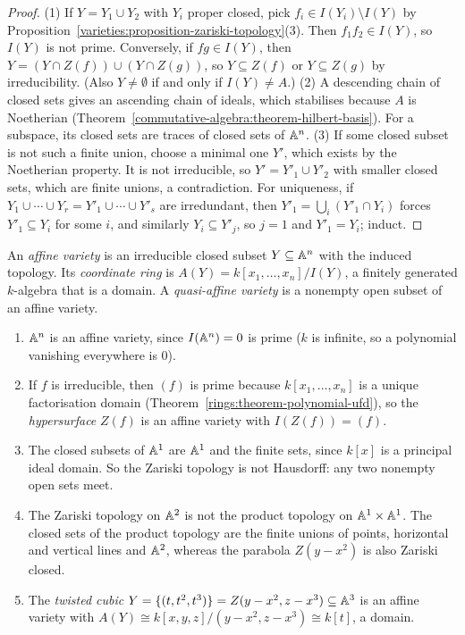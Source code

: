 \begin{proof}
(1) If $Y = Y_1 \cup Y_2$ with $Y_i$ proper closed, pick $f_i \in I(Y_i) \setminus I(Y)$ by Proposition~\ref{varieties:proposition-zariski-topology}(3).
Then $f_1f_2 \in I(Y)$, so $I(Y)$ is not prime. Conversely, if $fg \in I(Y)$, then $Y = (Y \cap Z(f)) \cup (Y \cap Z(g))$, so $Y \subseteq Z(f)$ or
$Y \subseteq Z(g)$ by irreducibility. (Also $Y \neq \emptyset$ if and only if $I(Y) \neq A$.) (2) A descending chain of closed sets gives an
ascending chain of ideals, which stabilises because $A$ is Noetherian (Theorem~\ref{commutative-algebra:theorem-hilbert-basis}). For a subspace,
its closed sets are traces of closed sets of $\mathbb{A}^n$. (3) If some closed subset is not such a finite union, choose a minimal one $Y'$, which
exists by the Noetherian property. It is not irreducible, so $Y' = Y'_1 \cup Y'_2$ with smaller closed sets, which are finite unions, a
contradiction. For uniqueness, if $Y_1 \cup \cdots \cup Y_r = Y'_1 \cup \cdots \cup Y'_s$ are irredundant, then
$Y'_1 = \bigcup_i(Y'_1 \cap Y_i)$ forces $Y'_1 \subseteq Y_i$ for some $i$, and similarly $Y_i \subseteq Y'_j$, so $j = 1$ and $Y'_1 = Y_i$; induct.
\end{proof}

\begin{definition}\label{varieties:definition-affine-variety}
An \emph{affine variety} is an irreducible closed subset $Y \subseteq \mathbb{A}^n$ with the induced topology. Its \emph{coordinate ring} is
$A(Y) = k[x_1, \ldots, x_n]/I(Y)$, a finitely generated $k$-algebra that is a domain. A \emph{quasi-affine variety} is a nonempty open subset
of an affine variety.
\end{definition}

\begin{example}\label{varieties:example-affine}
\begin{enumerate}
\item $\mathbb{A}^n$ is an affine variety, since $I(\mathbb{A}^n) = 0$ is prime ($k$ is infinite, so a polynomial vanishing everywhere is $0$).
\item If $f$ is irreducible, then $(f)$ is prime because $k[x_1, \ldots, x_n]$ is a unique factorisation domain
(Theorem~\ref{rings:theorem-polynomial-ufd}), so the \emph{hypersurface} $Z(f)$ is an affine variety with $I(Z(f)) = (f)$.
\item The closed subsets of $\mathbb{A}^1$ are $\mathbb{A}^1$ and the finite sets, since $k[x]$ is a principal ideal domain. So the Zariski topology is not
Hausdorff: any two nonempty open sets meet.
\item The Zariski topology on $\mathbb{A}^2$ is not the product topology on $\mathbb{A}^1 \times \mathbb{A}^1$. The closed sets of the product topology are the finite
unions of points, horizontal and vertical lines and $\mathbb{A}^2$, whereas the parabola $Z(y - x^2)$ is also Zariski closed.
\item The \emph{twisted cubic} $Y = \{(t, t^2, t^3)\} = Z(y - x^2, z - x^3) \subseteq \mathbb{A}^3$ is an affine variety with
$A(Y) \cong k[x, y, z]/(y - x^2, z - x^3) \cong k[t]$, a domain.
\end{enumerate}
\end{example}

